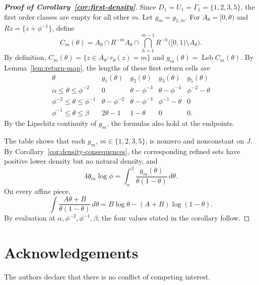 \documentclass[11pt]{amsart}
\theoremstyle{definition}
\begin{document}
\begin{proof}[\bf Proof of Corollary~\ref{cor:first-density}]
Since $D_1=U_1=\Gamma_1=\{1,2,3,5\}$, the first order classes are
empty for all other $m$. Let $g_m=g_{1,m}$. For
$A_\theta=[0,\theta)$ and $Rz=\{z+\phi^{-1}\}$, define
\[
 C_m(\theta)=A_\theta\cap R^{-m}A_\theta
 \cap\bigcap_{h=1}^{m-1}R^{-h}\bigl([0,1)\setminus A_\theta\bigr).
\]
By definition, $C_m(\theta)=\{z\in A_\theta:r_\theta(z)=m\}$ and
$g_m(\theta)=\operatorname{Leb}C_m(\theta)$. By
Lemma~\ref{lem:return-map}, the lengths of these first return cells are
\[
\begin{array}{c|cccc}
\theta&g_1(\theta)&g_2(\theta)&g_3(\theta)&g_5(\theta)\\ \hline
\alpha\leq\theta\leq\phi^{-2}
 &0&\theta-\phi^{-3}&\theta-\phi^{-4}&\phi^{-2}-\theta\\
\phi^{-2}\leq\theta\leq\phi^{-1}
 &\theta-\phi^{-2}&\theta-\phi^{-3}&\phi^{-1}-\theta&0\\
\phi^{-1}\leq\theta\leq\beta
 &2\theta-1&1-\theta&0&0.
\end{array}
\]
By the Lipschitz continuity of $g_m$, the formulas also hold at the
endpoints.

The table shows that each $g_m$, $m\in\{1,2,3,5\}$, is nonzero and
nonconstant on $J$. By Corollary~\ref{cor:density-consequences}, the
corresponding refined sets have positive lower density but no natural
density, and
\[
 4\mathfrak d_m\log\phi
 =\int_\alpha^\beta
 \frac{g_m(\theta)}{\theta(1-\theta)}\,d\theta.
\]
On every affine piece,
\[
 \int\frac{A\theta+B}{\theta(1-\theta)}\,d\theta
 =B\log\theta-(A+B)\log(1-\theta).
\]
By evaluation at $\alpha,\phi^{-2},\phi^{-1},\beta$, the four values
stated in the corollary follow.
\end{proof}






\section*{Acknowledgements}
\noindent
The authors declare that there is no conflict of competing interest.
\end{document}
